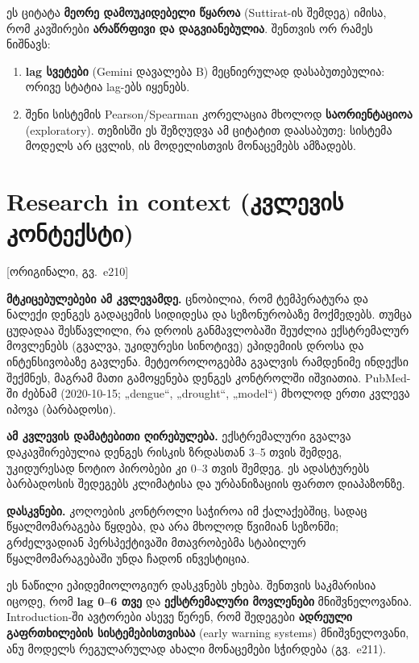 \documentclass[11pt,a4paper]{article}
\newcommand{\imp}[1]{\textbf{\color{importred}#1}}
\newcommand{\pg}[1]{{\small\color{gray}[ორიგინალი, გვ.~#1]}}
\begin{document}
\begin{etl}
ეს ციტატა \textbf{მეორე დამოუკიდებელი წყაროა} (Suttirat-ის შემდეგ) იმისა, რომ კავშირები \textbf{არაწრფივი და დაგვიანებულია}.
შენთვის ორ რამეს ნიშნავს:
\begin{enumerate}[leftmargin=1.5em]
  \item \textbf{lag სვეტები} (Gemini დავალება B) მეცნიერულად დასაბუთებულია: ორივე სტატია lag-ებს იყენებს.
  \item შენი სისტემის Pearson/Spearman კორელაცია მხოლოდ \imp{საორიენტაციოა} (exploratory). თეზისში ეს შეზღუდვა ამ ციტატით დაასაბუთე:
    სისტემა მოდელს არ ცვლის, ის მოდელისთვის მონაცემებს ამზადებს.
\end{enumerate}
\end{etl}

\section{Research in context (კვლევის კონტექსტი)} \pg{e210}

\textbf{მტკიცებულებები ამ კვლევამდე.} ცნობილია, რომ ტემპერატურა და ნალექი დენგეს გადაცემის სიდიდესა და სეზონურობაზე
მოქმედებს. თუმცა ცუდადაა შესწავლილი, რა დროის განმავლობაში შეუძლია ექსტრემალურ მოვლენებს (გვალვა, უკიდურესი სინოტივე)
ეპიდემიის დროსა და ინტენსივობაზე გავლენა. მეტეოროლოგებმა გვალვის რამდენიმე ინდექსი შექმნეს, მაგრამ მათი გამოყენება დენგეს
კონტროლში იშვიათია. PubMed-ში ძებნამ (2020-10-15; „dengue“, „drought“, „model“) მხოლოდ ერთი კვლევა იპოვა (ბარბადოსი).

\textbf{ამ კვლევის დამატებითი ღირებულება.} ექსტრემალური გვალვა დაკავშირებულია დენგეს რისკის ზრდასთან 3--5 თვის შემდეგ,
უკიდურესად ნოტიო პირობები კი 0--3 თვის შემდეგ. ეს ადასტურებს ბარბადოსის შედეგებს კლიმატისა და ურბანიზაციის ფართო დიაპაზონზე.

\textbf{დასკვნები.} კოღოების კონტროლი საჭიროა იმ ქალაქებშიც, სადაც წყალმომარაგება წყდება, და არა მხოლოდ წვიმიან სეზონში;
გრძელვადიან პერსპექტივაში მთავრობებმა სტაბილურ წყალმომარაგებაში უნდა ჩადონ ინვესტიცია.

\begin{skipbox}
ეს ნაწილი ეპიდემიოლოგიურ დასკვნებს ეხება. შენთვის საკმარისია იცოდე, რომ \textbf{lag 0--6 თვე} და \textbf{ექსტრემალური მოვლენები}
მნიშვნელოვანია. Introduction-ში ავტორები ასევე წერენ, რომ შედეგები \textbf{ადრეული გაფრთხილების სისტემებისთვისაა} (early
warning systems) მნიშვნელოვანი, ანუ მოდელს რეგულარულად ახალი მონაცემები სჭირდება (გვ.~e211).
\end{skipbox}
\end{document}
